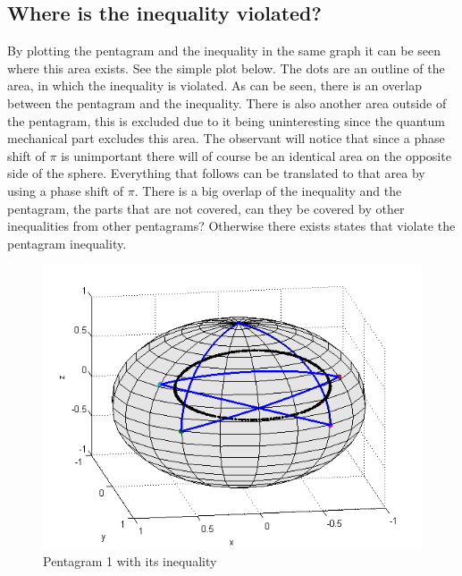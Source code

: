 \subsection{Where is the inequality violated?}\label{subsec:Where is the inequality violated?}
By plotting the pentagram and the inequality in the same graph it can be seen where this area exists. See the simple plot below.
The dots are an outline of the area, in which the inequality is violated. As can be seen, there is an overlap between the pentagram and the inequality. There is also another area outside of the pentagram, this is excluded due to it being uninteresting since the quantum mechanical part excludes this area.
The observant will notice that since a phase shift of $\pi$ is unimportant there will of course be an identical area on the opposite side of the sphere. Everything that follows can be translated to that area by using a phase shift of $\pi$. There is a big overlap of the inequality and the pentagram, the parts that are not covered, can they be covered by other inequalities from other pentagrams? Otherwise there exists states that violate the pentagram inequality.
\begin{figure}[H]
\begin{center}
\includegraphics[scale=0.6]{sphere1ine.png}
\caption{Pentagram 1 with its inequality}
\end{center}
\end{figure}
\newpage

